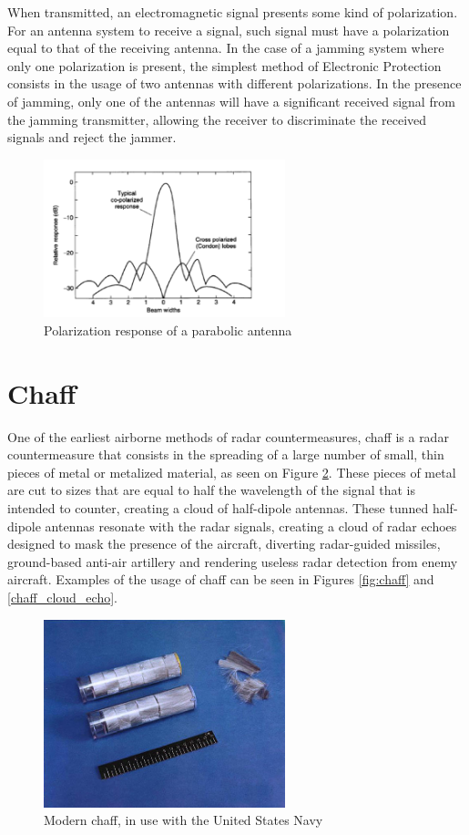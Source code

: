 \documentclass[english,purist]{ist-report}
\begin{document}
When transmitted, an electromagnetic signal presents some kind of polarization. For an antenna system to receive a signal, such signal must have a polarization equal to that of the receiving antenna. In the case of a jamming system where only one polarization is present, the simplest method of Electronic Protection consists in the usage of two antennas with different polarizations. In the presence of jamming, only one of the antennas will have a significant received signal from the jamming transmitter, allowing the receiver to discriminate the received signals and reject the jammer. 

\begin{figure}[ht]
\centering
\includegraphics[width=70mm]{parabolic_polarization_response.png}
\caption{Polarization response of a parabolic antenna}
\label{sidelobe_suppression}
\end{figure} 

\section{Chaff}

One of the earliest airborne methods of radar countermeasures, chaff is a radar countermeasure that consists in the spreading of a large number of small, thin pieces of metal or metalized material, as seen on Figure \ref{chaff_photo}. These pieces of metal are cut to sizes that are equal to half the wavelength of the signal that is intended to counter, creating a cloud of half-dipole antennas. These tunned half-dipole antennas resonate with the radar signals, creating a cloud of radar echoes designed to mask the presence of the aircraft, diverting radar-guided missiles, ground-based anti-air artillery and rendering useless radar detection from enemy aircraft. Examples of the usage of chaff can be seen in Figures \ref{fig:chaff} and \ref{chaff_cloud_echo}.

\begin{figure}[ht]
\centering
\includegraphics[width=70mm]{Usnchaff.jpg}
\caption{Modern chaff, in use with the United States Navy}
\label{chaff_photo}
\end{figure} 
\end{document}
